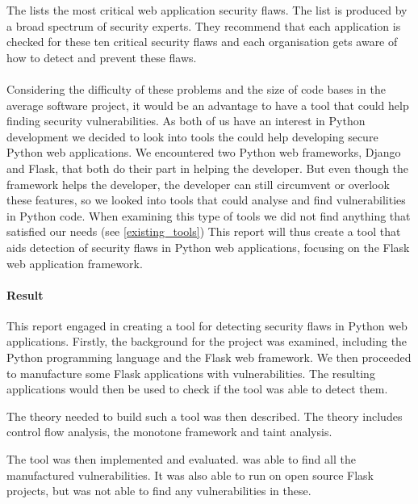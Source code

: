 The \citet{OWASP10} lists the most critical web application security flaws.
The list is produced by a broad spectrum of security experts. 
They recommend that each application is checked for these ten critical security flaws and each organisation gets aware of how to detect and prevent these flaws.

\paragraph{}
Considering the difficulty of these problems and the size of code bases in the average software project, it would be an advantage to have a tool that could help finding security vulnerabilities.
As both of us have an interest in Python development we decided to look into tools the could help developing secure Python web applications.
We encountered two Python web frameworks, Django and Flask, that both do their part in helping the developer.
But even though the framework helps the developer, the developer can still circumvent or overlook these features, so we looked into tools that could analyse and find vulnerabilities in Python code.
When examining this type of tools we did not find anything that satisfied our needs (see \cref{existing_tools})
This report will thus create a tool that aids detection of security flaws in Python web applications, focusing on the Flask web application framework.

\paragraph{Result}
This report engaged in creating a tool for detecting security flaws in Python web applications.
Firstly, the background for the project was examined, including the Python programming language and the Flask web framework.
We then proceeded to manufacture some Flask applications with vulnerabilities.
The resulting applications would then be used to check if the tool was able to detect them.

The theory needed to build such a tool was then described.
The theory includes control flow analysis, the monotone framework and taint analysis.

The tool \pyt{} was then implemented and evaluated.
\pyt{} was able to find all the manufactured vulnerabilities.
It was also able to run on open source Flask projects, but was not able to find any vulnerabilities in these.


\printbibliography

